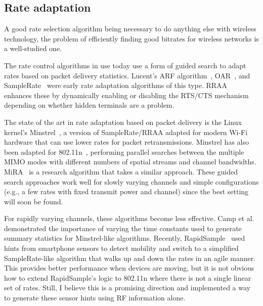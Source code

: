 \subsection{Rate adaptation}
A good rate selection algorithm being necessary to do anything else with wireless technology, the problem of efficiently finding good bitrates for wireless networks is a well-studied one.

The rate control algorithms in use today use a form of guided search to adapt rates based on packet delivery statistics. Lucent's ARF algorithm~\cite{Lucent_ARF}, OAR~\cite{Sadeghi_OAR}, and SampleRate~\cite{Bicket_SampleRate} were early rate adaptation algorithms of this type. RRAA~\cite{Wong_RRAA} enhances these by dynamically enabling or disabling the RTS/CTS mechanism depending on whether hidden terminals are a problem.

The state of the art in rate adaptation based on packet delivery is the Linux kernel's Minstrel~\cite{Minstrel}, a version of SampleRate/RRAA adapted for modern Wi-Fi hardware that can use lower rates for packet retransmissions. Minstrel has also been adapted for 802.11n~\cite{Minstrel_HT}, performing parallel searches between the multiple MIMO modes with different numbers of spatial streams and channel bandwidths. MiRA~\cite{Pefkianakis_MiRA} is a research algorithm that takes a similar approach. These guided search approaches work well for slowly varying channels and simple configurations (e.g., a few rates with fixed transmit power and channel) since the best setting will soon be found.

For rapidly varying channels, these algorithms become less effective. Camp et al.~\cite{Camp_rateadapt} demonstrated the importance of varying the time constants used to generate summary statistics for Minstrel-like algorithms. Recently, RapidSample~\cite{Ravindranath_SensorHints} used hints from smartphone sensors to detect mobility and switch to a simplified SampleRate-like algorithm that walks up and down the rates in an agile manner. This provides better performance when devices are moving, but it is not obvious how to extend RapidSample's logic to 802.11n where there is not a single linear set of rates. Still, I believe this is a promising direction and implemented a way to generate these sensor hints using RF information alone.

